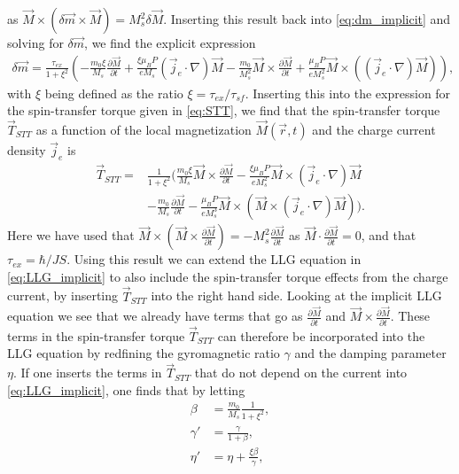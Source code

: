 \documentclass[12pt, a4paper, twoside, openright]{article}		%
\numberwithin{equation}{section}
\begin{document}
as $\vec{M} \times (\delta\vec{m}\times\vec{M}) = M_s^2\delta\vec{M}$. Inserting this result back into \eqref{eq:dm_implicit} and solving for $\delta\vec{m}$, we find the explicit expression
\begin{align}
\label{eq:dm_explicit}
\delta\vec{m} = \frac{\tau_{ex}}{1+\xi^2}\left(-\frac{m_0\xi}{M_s}\frac{\partial \vec{M}}{\partial t} + \frac{\xi \mu_B P}{e M_s}(\vec{j}_e\cdot\nabla)\vec{M} - \frac{m_0}{M_s^2}\vec{M}\times \frac{\partial \vec{M}}{\partial t} + \frac{\mu_B P}{e M_s^2}\vec{M}\times((\vec{j}_e\cdot\nabla)\vec{M})\right),
\end{align}
with $\xi$ being defined as the ratio $\xi = \tau_{ex}/\tau_{sf}$. Inserting this into the expression for the spin-transfer torque given in \eqref{eq:STT}, we find that the spin-transfer torque $\vec{T}_{STT}$ as a function of the local magnetization $\vec{M}(\vec{r}, t)$ and the charge current density $\vec{j}_e$ is 
\begin{align}
\nonumber\vec{T}_{STT} = &\frac{1}{1+\xi^2} \bigg(\frac{m_0\xi}{M_s}\vec{M}\times\frac{\partial \vec{M}}{\partial t} - \frac{\xi\mu_B P}{e M_s^2}\vec{M}\times(\vec{j}_e\cdot\nabla)\vec{M} \\
&- \frac{m_0}{M_s} \frac{\partial \vec{M}}{\partial t} - \frac{\mu_B P}{e M_s^3} \vec{M}\times (\vec{M}\times(\vec{j}_e\cdot\nabla)\vec{M})\bigg).\label{eq:STT_final}
\end{align}
Here we have used that $\vec{M}\times(\vec{M}\times\frac{\partial \vec{M}}{\partial t}) = -M_s^2\frac{\partial \vec{M}}{\partial t}$ as $\vec{M}\cdot\frac{\partial \vec{M}}{\partial t} = 0$, and that $\tau_{ex} = \hbar/JS$. Using this result we can extend the LLG equation in \eqref{eq:LLG_implicit} to also include the spin-transfer torque effects from the charge current, by inserting $\vec{T}_{STT}$ into the right hand side. Looking at the implicit LLG equation we see that we already have terms that go as $\frac{\partial \vec{M}}{\partial t}$ and $\vec{M}\times\frac{\partial \vec{M}}{\partial t}$. These terms in the spin-transfer torque $\vec{T}_{STT}$ can therefore be incorporated into the LLG equation by redfining the gyromagnetic ratio $\gamma$ and the damping parameter $\eta$. If one inserts the terms in $\vec{T}_{STT}$ that do not depend on the current into \eqref{eq:LLG_implicit}, one finds that by letting
\begin{align}
\beta &= \frac{m_0}{M_s}\frac{1}{1+\xi^2}, \\
\gamma ' &= \frac{\gamma}{1+\beta}, \\
\eta ' &= \eta + \frac{\xi\beta}{\gamma},
\end{align}
\end{document}
